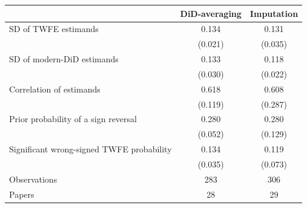 \begin{tabular}{lcc}
\toprule
 & DiD-averaging & Imputation \\
\midrule
SD of TWFE estimands & 0.134 & 0.131 \\
 & (0.021) & (0.035) \\
SD of modern-DiD estimands & 0.133 & 0.118 \\
 & (0.030) & (0.022) \\
Correlation of estimands & 0.618 & 0.608 \\
 & (0.119) & (0.287) \\
Prior probability of a sign reversal & 0.280 & 0.280 \\
 & (0.052) & (0.129) \\
Significant wrong-signed TWFE probability & 0.134 & 0.119 \\
 & (0.035) & (0.073) \\
\midrule
Observations & 283 & 306 \\
Papers & 28 & 29 \\
\bottomrule
\end{tabular}

